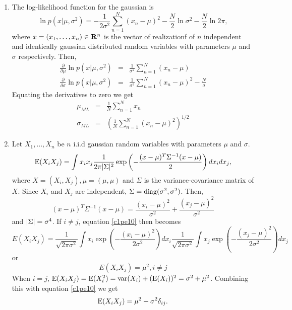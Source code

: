 \begin{enumerate}
\item The log-likelihood function for the gaussian is
\[
\ln p(x | \mu, \sigma^2) = -\frac{1}{2\sigma^2}\sum_{n=1}^N(x_n - \mu)^2 - \frac{N}{2}\ln\sigma^2 - \frac{N}{2}\ln 2\pi,
\]
where $x = (x_1, \ldots, x_n) \in \mathbf{R}^n$ is the vector of realizationf of $n$ independent and identically gaussian 
distributed random variables with parameters $\mu$ and $\sigma$ respectively. Then,
\begin{eqnarray*}
\frac{\partial}{\partial\mu}\ln p(x | \mu, \sigma^2) &=& \frac{1}{\sigma^2}\sum_{n=1}^N (x_n - \mu) \\
\frac{\partial}{\partial\sigma}\ln p(x | \mu, \sigma^2) &=& \frac{1}{\sigma^3}\sum_{n=1}^N (x_n - \mu)^2 - \frac{N}{\sigma} 
\end{eqnarray*}
Equating the derivatives to zero we get
\begin{eqnarray*}
\mu_{ML} &=& \frac{1}{N}\sum_{n=1}^N x_n \\
\sigma_{ML} &=& \left(\frac{1}{N}\sum_{n=1}^N(x_n - \mu)^2\right)^{1/2}
\end{eqnarray*}

\item Let $X_1, \ldots, X_n$ be $n$ i.i.d gaussian random variables with parameters $\mu$ and $\sigma$.
\begin{equation}\label{c1pe10}
\operatorname{E}(X_i X_j) = \int x_i x_j \frac{1}{2\pi\lvert\Sigma\rvert^2}\exp\left(-\frac{(x - \mu)^T\Sigma^{-1}(x - \mu)}{2}\right)dx_i dx_j,
\end{equation}
where $X = (X_i, X_j), \mu = (\mu, \mu)$ and $\Sigma$ is the variance-covariance matrix
of $X$. Since $X_i$ and $X_j$ are independent, $\Sigma = \operatorname{diag}(\sigma^2, \sigma^2)$. Then,
\[
(x - \mu)^T\Sigma^{-1}(x - \mu) = \frac{(x_i - \mu)^2}{\sigma^2} + \frac{(x_j - \mu)^2}{\sigma^2}
\]
and $\lvert\Sigma\rvert = \sigma^4$. If $i \ne j$, equation \eqref{c1pe10} then becomes
\[
E(X_iX_j) = \frac{1}{\sqrt{2\pi\sigma^2}}\int x_i \exp\left(-\frac{(x_i - \mu)^2}{2\sigma^2}\right)dx_i
            \frac{1}{\sqrt{2\pi\sigma^2}}\int x_j \exp\left(-\frac{(x_j - \mu)^2}{2\sigma^2}\right)dx_j
\]
or
\begin{equation}\label{c1pe11}
E(X_iX_j) = \mu^2, i \ne j
\end{equation}
When $i = j$, $\operatorname{E}(X_iX_j) = \operatorname{E}(X_i^2) = \operatorname{var}(X_i) + (\operatorname{E}(X_i))^2 = \sigma^2 + \mu^2$. Combining
this with equation \eqref{c1pe10} we get
\[
\operatorname{E}(X_iX_j) = \mu^2 + \sigma^2\delta_{ij}.
\]


\end{enumerate}
